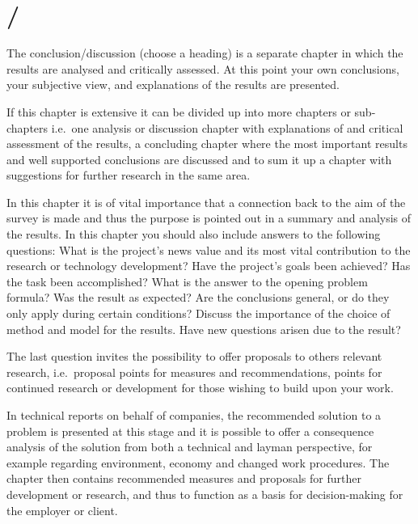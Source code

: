 \section{ / }\label{sec:conclusion}
The conclusion/discussion (choose a heading) is a separate chapter in which the
results are analysed and critically assessed. At this point your own
conclusions, your subjective view, and explanations of the results are
presented.

If this chapter is extensive it can be divided up into more chapters or
sub-chapters i.e.\ one analysis or discussion chapter with explanations of and
critical assessment of the results, a concluding chapter where the most
important results and well supported conclusions are discussed and to sum it up
a chapter with suggestions for further research in the same area.

In this chapter it is of vital importance that a connection back to the aim of
the survey is made and thus the purpose is pointed out in a summary and analysis
of the results.  In this chapter you should also include answers to the
following questions: What is the project's news value and its most vital
contribution to the research or technology development? Have the project’s goals
been achieved? Has the task been accomplished? What is the answer to the opening
problem formula? Was the result as expected? Are the conclusions general, or do
they only apply during certain conditions? Discuss the importance of the choice
of method and model for the results. Have new questions arisen due to the
result?

The last question invites the possibility to offer proposals to others relevant
research, i.e.\ proposal points for measures and recommendations, points for
continued research or development for those wishing to build upon your work.

In technical reports on behalf of companies, the recommended solution to a
problem is presented at this stage and it is possible to offer a consequence
analysis of the solution from both a technical and layman perspective, for
example regarding environment, economy and changed work procedures. The chapter
then contains recommended measures and proposals for further development or
research, and thus to function as a basis for decision-making for the employer
or client.

